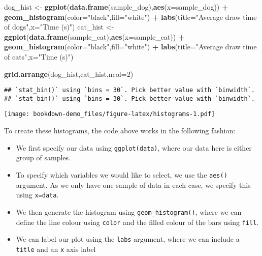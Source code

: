 \documentclass[
]{book}
\newenvironment{Shaded}{\begin{snugshade}}{\end{snugshade}}
\newcommand{\DataTypeTok}[1]{\textcolor[rgb]{0.13,0.29,0.53}{#1}}
\newcommand{\DecValTok}[1]{\textcolor[rgb]{0.00,0.00,0.81}{#1}}
\newcommand{\KeywordTok}[1]{\textcolor[rgb]{0.13,0.29,0.53}{\textbf{#1}}}
\newcommand{\NormalTok}[1]{#1}
\newcommand{\OperatorTok}[1]{\textcolor[rgb]{0.81,0.36,0.00}{\textbf{#1}}}
\newcommand{\StringTok}[1]{\textcolor[rgb]{0.31,0.60,0.02}{#1}}
\providecommand{\tightlist}{%
  \setlength{\itemsep}{0pt}\setlength{\parskip}{0pt}}
\begin{document}
\begin{Shaded}
\begin{Highlighting}[]
\NormalTok{dog_hist <-}\StringTok{ }\KeywordTok{ggplot}\NormalTok{(}\KeywordTok{data.frame}\NormalTok{(sample_dog),}\KeywordTok{aes}\NormalTok{(}\DataTypeTok{x=}\NormalTok{sample_dog)) }\OperatorTok{+}\StringTok{ }\KeywordTok{geom_histogram}\NormalTok{(}\DataTypeTok{color=}\StringTok{"black"}\NormalTok{,}\DataTypeTok{fill=}\StringTok{"white"}\NormalTok{) }\OperatorTok{+}\StringTok{ }
\StringTok{            }\KeywordTok{labs}\NormalTok{(}\DataTypeTok{title=}\StringTok{"Average draw time of dogs"}\NormalTok{,}\DataTypeTok{x=}\StringTok{"Time (s)"}\NormalTok{)}
\NormalTok{cat_hist <-}\StringTok{ }\KeywordTok{ggplot}\NormalTok{(}\KeywordTok{data.frame}\NormalTok{(sample_cat),}\KeywordTok{aes}\NormalTok{(}\DataTypeTok{x=}\NormalTok{sample_cat)) }\OperatorTok{+}\StringTok{ }\KeywordTok{geom_histogram}\NormalTok{(}\DataTypeTok{color=}\StringTok{"black"}\NormalTok{,}\DataTypeTok{fill=}\StringTok{"white"}\NormalTok{) }\OperatorTok{+}\StringTok{ }
\StringTok{  }\KeywordTok{labs}\NormalTok{(}\DataTypeTok{title=}\StringTok{"Average draw time of cats"}\NormalTok{,}\DataTypeTok{x=}\StringTok{"Time (s)"}\NormalTok{)}

\KeywordTok{grid.arrange}\NormalTok{(dog_hist,cat_hist,}\DataTypeTok{ncol=}\DecValTok{2}\NormalTok{)}
\end{Highlighting}
\end{Shaded}

\begin{verbatim}
## `stat_bin()` using `bins = 30`. Pick better value with `binwidth`.
## `stat_bin()` using `bins = 30`. Pick better value with `binwidth`.
\end{verbatim}

\texttt{[image: bookdown-demo\_files/figure-latex/histograms-1.pdf]}

To create these histograms, the code above works in the following fashion:

\begin{itemize}
\tightlist
\item
  We first specify our data using \texttt{ggplot(data)}, where our data here is either group of samples.
\item
  To specify which variables we would like to select, we use the \texttt{aes()} argument. As we only have one sample of data in each case, we specify this using \texttt{x=data}.
\item
  We then generate the histogram using \texttt{geom\_histogram()}, where we can define the line colour using \texttt{color} and the filled colour of the bars using \texttt{fill}.
\item
  We can label our plot using the \texttt{labs} argument, where we can include a \texttt{title} and an \texttt{x} axis label
\end{itemize}
\end{document}
